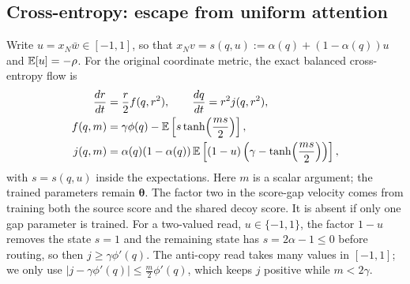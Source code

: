 \subsection{Cross-entropy: escape from uniform attention}
\label{app:ce-proof}
Write $u=x_N\bar w\in[-1,1]$, so that $x_N v=s(q,u):=\alpha(q)+(1-\alpha(q))u$ and $\mathbb E[u]=-\rho$.
For the original coordinate metric, the exact balanced cross-entropy flow is
\begin{align}
 \frac{d r}{d t}&=\frac{r}{2} f(q,r^2),\qquad \frac{d q}{d t}=r^2j(q,r^2),\label{eq:ce-flow}\\
 f(q,m)&=\gamma \phi(q)-\mathbb E\left[s\tanh\!\left(\frac{m s}{2}\right)\right],\notag\\
 j(q,m)&=\alpha(q)(1-\alpha(q))\,\mathbb E\left[(1-u)\left(\gamma-\tanh\!\left(\frac{m s}{2}\right)\right)\right],\notag
\end{align}
with $s=s(q,u)$ inside the expectations.
Here $m$ is a scalar argument; the trained parameters remain $\bm\theta$.
The factor two in the score-gap velocity comes from training both the source score and the shared decoy score.
It is absent if only one gap parameter is trained.
For a two-valued read, $u\in\{-1,1\}$, the factor $1-u$ removes the state $s=1$ and the remaining state has $s=2\alpha-1\le0$ before routing,
so then $j\ge\gamma\phi'(q)$. The anti-copy read takes many values in $[-1,1]$; we only use $|j-\gamma\phi'(q)|\le\tfrac{m}{2}\phi'(q)$,
which keeps $j$ positive while $m<2\gamma$.

